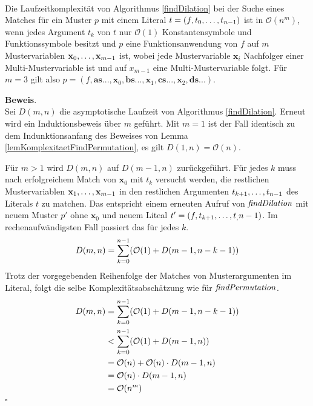 \begin{lemma}\label{lemKomplexitaetDilation}~\\
Die Laufzeitkomplexität von Algorithmus \ref{findDilation} bei der Suche eines Matches für ein Muster $p$  mit einem Literal $t = (f, {t}_{0}, \dots, {t}_{n-1})$ ist in $\mathcal O(n^m)$, wenn jedes Argument $t_k$ von $t$ nur $\mathcal O(1)$ Konstantensymbole und Funktionssymbole besitzt und $p$ eine Funktionsanwendung von $f$ auf $m$ Mustervariablen ${\mathbf x}_{0}, \dots, {\mathbf x}_{m-1}$ ist, 
wobei jede Mustervariable $\mathbf x_i$ Nachfolger einer Multi-Mustervariable ist und auf $x_{m-1}$ eine Multi-Mustervariable folgt. Für $m = 3$ gilt also $p = (f, \mathbf{as...}, \mathbf x_0, \mathbf{bs...}, \mathbf x_1, \mathbf{cs...}, \mathbf x_2, \mathbf{ds...})$.
\end{lemma}

\textbf{Beweis}.\\
Sei $D(m, n)$ die asymptotische Laufzeit von Algorithmus \ref{findDilation}. Erneut wird ein Induktionsbeweis über $m$ geführt.
Mit $m = 1$ ist der Fall identisch zu dem Indunktionsanfang des Beweises von Lemma \ref{lemKomplexitaetFindPermutation}, es gilt $D(1, n) = \mathcal O(n)$. 

Für $m > 1$ wird $D(m, n)$ auf $D(m-1, n)$ zurückgeführt. Für jedes $k$ muss nach erfolgreichem Match von $\mathbf x_0$ mit $t_k$ versucht werden, die restlichen Mustervariablen ${\mathbf x}_{1}, \dots, {\mathbf x}_{m-1}$ in den restlichen Argumenten ${t}_{k+1}, \dots, {t}_{n-1}$ des Literals $t$ zu matchen. Das entspricht einem erneuten Aufruf von $\mathit{findDilation}$ mit neuem Muster $p'$ ohne $\mathbf x_0$ und neuem Liteal $t' = (f, {t}_{k+1}, \dots, {t}_{,} {n-1})$.
Im rechenaufwändigsten Fall passiert das für jedes $k$.
$$D(m, n) = \sum_{k = 0}^{n-1} \paren*{\mathcal O(1) + D(m-1, n - k - 1)}$$
Trotz der vorgegebenden Reihenfolge der Matches von Musterargumenten im Literal, folgt die selbe Komplexitätsabschätzung wie für $\mathit{findPermutation}$.
\begin{equation*}
	\begin{split} 
		D(m, n) 
		&= \sum_{k = 0}^{n-1} \paren*{\mathcal O(1) + D(m-1, n - k - 1)}\\ 
		&< \sum_{k = 0}^{n-1} \paren*{\mathcal O(1) + D(m-1, n)}\\
		&= \mathcal O(n) + \mathcal O(n) \cdot D(m-1, n)\\
		&= \mathcal O(n) \cdot D(m-1, n)\\
		&= \mathcal O(n^m)
	\end{split}
\end{equation*}
\hfill $\square$\\



